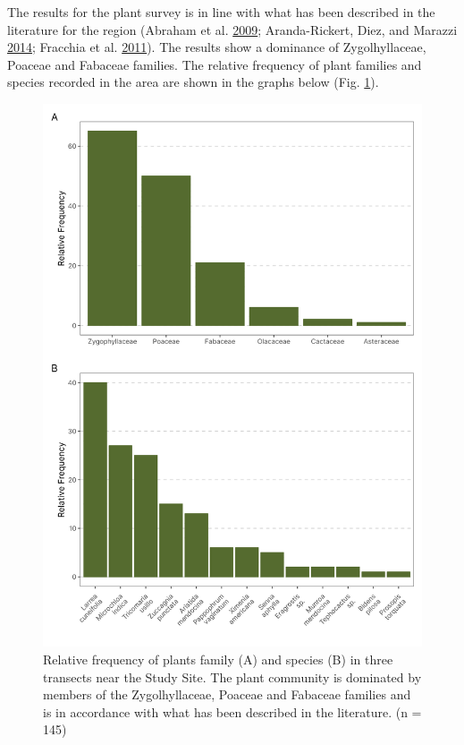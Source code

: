 \documentclass[msc,numbers,hidelinks]{coppe}
\begin{document}
  The results for the plant survey is in line with what has been described in the literature for the region (Abraham et al. \protect\hyperlink{ref-abrahamOverviewGeographyMonte2009}{2009}; Aranda-Rickert, Diez, and Marazzi \protect\hyperlink{ref-aranda-rickertExtrafloralNectarFuels2014}{2014}; Fracchia et al. \protect\hyperlink{ref-fracchiaDispersalArbuscularMycorrhizal2011}{2011}). The results show a dominance of Zygolhyllaceae, Poaceae and Fabaceae families. The relative frequency of plant families and species recorded in the area are shown in the graphs below (Fig. \ref{fig:appendix-plants}).
  \begin{figure}
  \includegraphics[width=1\linewidth]{../05_figures/plants/plant_frequency} \caption{Relative frequency of plants family (A) and species (B) in three transects near the Study Site. The plant community is dominated by members of the Zygolhyllaceae, Poaceae and Fabaceae families and is in accordance with what has been described in the literature. (n = 145)}\label{fig:appendix-plants}
  \end{figure}
\end{document}
